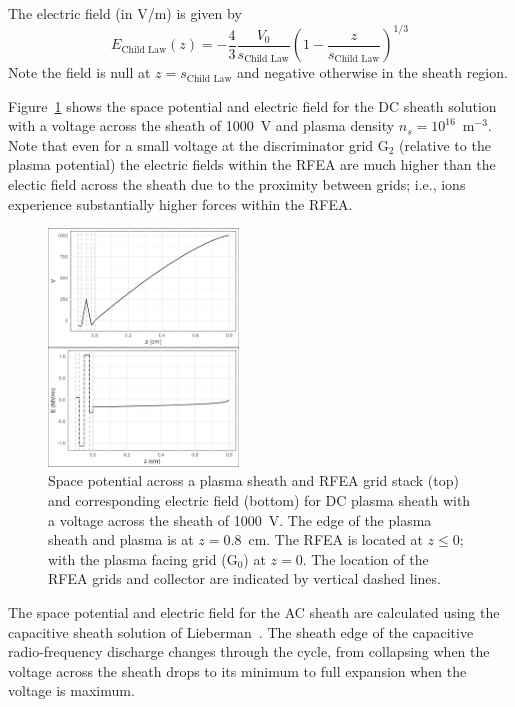 The electric field (in V/m) is given by
\begin{equation}
E_\text{Child Law}(z) = -\frac{4}{3} \frac{V_0}{s_\text{Child Law}} \left( 1 - \frac{z}{s_\text{Child Law}}  \right)^{1/3}
\end{equation}
Note the field is null at $z=s_\text{Child Law}$ and negative otherwise in the sheath region. 

Figure~\ref{fig:DCpotentialField} shows the space potential and electric field for the DC sheath solution with a voltage across the sheath of 1000~V and plasma density $n_s = 10^{16}$~m$^{-3}$. Note that even for a small voltage at the discriminator grid G$_2$ (relative to the plasma potential) the electric fields within the RFEA are much higher than the electic field across the sheath due to the proximity between grids; i.e., ions experience substantially higher forces within the RFEA. 

\begin{figure}[htbp]
\centering
\includegraphics[width=0.45\textwidth]{Figures/VEz2DC1kVStack2332.jpeg}
\caption{Space potential across a plasma sheath and RFEA grid stack (top) and corresponding electric field (bottom) for DC plasma sheath with a voltage across the sheath of 1000~V. The edge of the plasma sheath and plasma is at $z=0.8$~cm. The RFEA is located at $z\le0$; with the plasma facing grid (G$_0$) at $z=0$. The location of the RFEA grids and collector are indicated by vertical dashed lines.}
\label{fig:DCpotentialField}
\end{figure}



The space potential and electric field for the AC sheath are calculated using the capacitive sheath solution of Lieberman~\cite{Lieberman1988,Lieberman1989}. The sheath edge of the capacitive radio-frequency discharge changes through the cycle, from collapsing when the voltage across the sheath drops to its minimum to full expansion when the voltage is maximum. 

